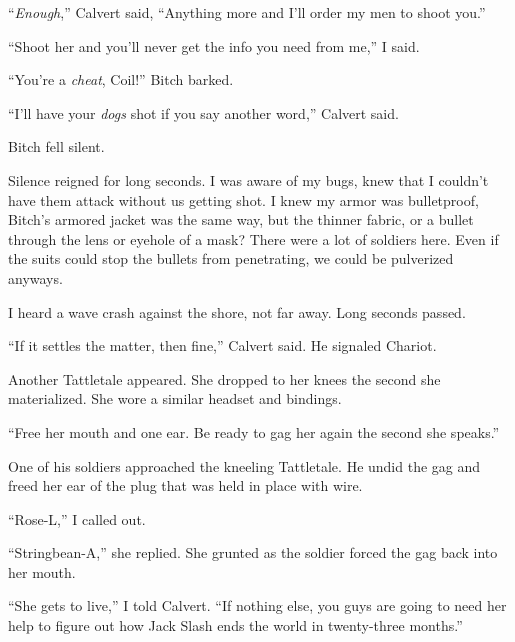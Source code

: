 ``\emph{Enough},'' Calvert said, ``Anything more and I'll order my men to shoot you.''



``Shoot her and you'll never get the info you need from me,'' I said.



``You're a \emph{cheat}, Coil!'' Bitch barked.



``I'll have your \emph{dogs} shot if you say another word,'' Calvert said.



Bitch fell silent.



Silence reigned for long seconds.  I was aware of my bugs, knew that I couldn't have them attack without us getting shot.  I knew my armor was bulletproof, Bitch's armored jacket was the same way, but the thinner fabric, or a bullet through the lens or eyehole of a mask?  There were a lot of soldiers here.  Even if the suits could stop the bullets from penetrating, we could be pulverized anyways.



I heard a wave crash against the shore, not far away.  Long seconds passed.



``If it settles the matter, then fine,'' Calvert said.  He signaled Chariot.



Another Tattletale appeared.  She dropped to her knees the second she materialized.  She wore a similar headset and bindings.



``Free her mouth and one ear.  Be ready to gag her again the second she speaks.''



One of his soldiers approached the kneeling Tattletale.  He undid the gag and freed her ear of the plug that was held in place with wire.



``Rose-L,'' I called out.



``Stringbean-A,'' she replied.  She grunted as the soldier forced the gag back into her mouth.



``She gets to live,'' I told Calvert.  ``If nothing else, you guys are going to need her help to figure out how Jack Slash ends the world in twenty-three months.''



